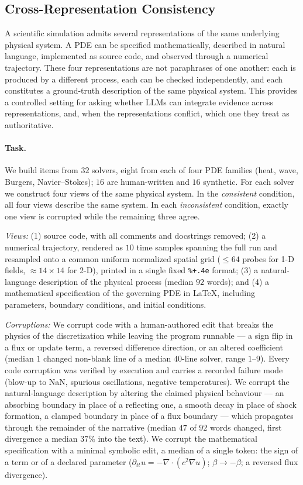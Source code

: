 \subsection{Cross-Representation Consistency}
\label{sec:cross_representation}

A scientific simulation admits several representations of the same underlying
physical system. A PDE can be specified mathematically, described in natural
language, implemented as source code, and observed through a numerical trajectory.
These four representations are not paraphrases of one another: each is produced by a
different process, each can be checked independently, and each constitutes a
ground-truth description of the same physical system. This provides a controlled
setting for asking whether LLMs can integrate evidence across representations, and,
when the representations conflict, which one they treat as authoritative.

\paragraph{Task.}
We build items from $32$ solvers, eight from each of four PDE families (heat, wave,
Burgers, Navier--Stokes); $16$ are human-written and $16$ synthetic. For each solver
we construct four views of the same physical system. In the \emph{consistent}
condition, all four views describe the same system. In each \emph{inconsistent}
condition, exactly one view is corrupted while the remaining three agree.

\emph{Views:} (1) source code, with all comments and docstrings removed; (2) a
numerical trajectory, rendered as $10$ time samples spanning the full run and
resampled onto a common uniform normalized spatial grid ($\leq 64$ probes for 1-D
fields, $\approx 14 \times 14$ for 2-D), printed in a single fixed \texttt{\%+.4e}
format; (3) a natural-language description of the physical process (median $92$
words); and (4) a mathematical specification of the governing PDE in \LaTeX,
including parameters, boundary conditions, and initial conditions.

\emph{Corruptions:} We corrupt code with a human-authored edit that breaks the
physics of the discretization while leaving the program runnable --- a sign flip in
a flux or update term, a reversed difference direction, or an altered coefficient
(median $1$ changed non-blank line of a median $40$-line solver, range $1$--$9$).
Every code corruption was verified by execution and carries a recorded failure mode
(blow-up to NaN, spurious oscillations, negative temperatures). We corrupt the
natural-language description by altering the claimed physical behaviour --- an
absorbing boundary in place of a reflecting one, a smooth decay in place of shock
formation, a clamped boundary in place of a flux boundary --- which propagates
through the remainder of the narrative (median $47$ of $92$ words changed, first
divergence a median $37\%$ into the text). We corrupt the mathematical specification
with a minimal symbolic edit, a median of a single token: the sign of a term or of a
declared parameter ($\partial_{tt}u = -\nabla\!\cdot\!(c^2\nabla u)$; $\beta \to
-\beta$; a reversed flux divergence).

